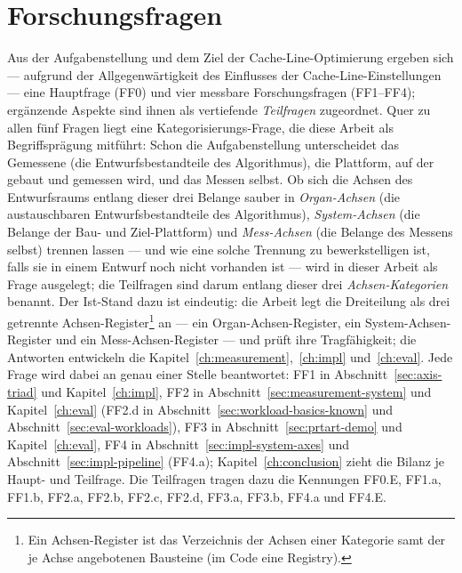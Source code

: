 \section{Forschungsfragen}\label{sec:rqs}
Aus der Aufgabenstellung und dem Ziel der Cache-Line-Optimierung ergeben sich --- aufgrund der
Allgegenwärtigkeit des Einflusses der Cache-Line-Einstellungen --- eine Hauptfrage (FF0) und vier
messbare Forschungsfragen (FF1--FF4); ergänzende Aspekte sind ihnen als vertiefende \emph{Teilfragen} zugeordnet.
Quer zu allen fünf Fragen liegt eine Kategorisierungs-Frage, die diese Arbeit als Begriffsprägung
mitführt: Schon die Aufgabenstellung unterscheidet das Gemessene (die Entwurfsbestandteile des
Algorithmus), die Plattform, auf der gebaut und gemessen wird, und das Messen selbst. Ob sich die
Achsen des Entwurfsraums entlang dieser drei Belange sauber in \emph{Organ-Achsen} (die
austauschbaren Entwurfsbestandteile des Algorithmus), \emph{System-Achsen} (die Belange der Bau-
und Ziel-Plattform) und \emph{Mess-Achsen} (die Belange des Messens selbst) trennen lassen --- und
wie eine solche Trennung zu bewerkstelligen ist, falls sie in einem Entwurf noch nicht vorhanden
ist --- wird in dieser Arbeit als Frage ausgelegt; die Teilfragen sind darum entlang dieser drei
\emph{Achsen-Kategorien} benannt. Der Ist-Stand dazu ist eindeutig: die Arbeit legt die Dreiteilung als
drei getrennte Achsen-Register\footnote{Ein Achsen-Register ist das Verzeichnis der Achsen einer
  Kategorie samt der je Achse angebotenen Bausteine (im Code eine Registry).} an --- ein
Organ-Achsen-Register, ein System-Achsen-Register und ein
Mess-Achsen-Register --- und prüft ihre Tragfähigkeit; die Antworten entwickeln die
Kapitel~\ref{ch:measurement},~\ref{ch:impl} und~\ref{ch:eval}.
Jede Frage wird dabei an genau einer Stelle beantwortet: FF1 in Abschnitt~\ref{sec:axis-triad} und
Kapitel~\ref{ch:impl}, FF2 in Abschnitt~\ref{sec:measurement-system} und Kapitel~\ref{ch:eval}
(FF2.d in Abschnitt~\ref{sec:workload-basics-known} und Abschnitt~\ref{sec:eval-workloads}), FF3 in
Abschnitt~\ref{sec:prtart-demo} und Kapitel~\ref{ch:eval}, FF4 in
Abschnitt~\ref{sec:impl-system-axes} und Abschnitt~\ref{sec:impl-pipeline} (FF4.a);
Kapitel~\ref{ch:conclusion} zieht die Bilanz je Haupt- und
Teilfrage. Die Teilfragen tragen dazu die Kennungen FF0.E, FF1.a, FF1.b, FF2.a, FF2.b, FF2.c, FF2.d,
FF3.a, FF3.b, FF4.a und FF4.E.
